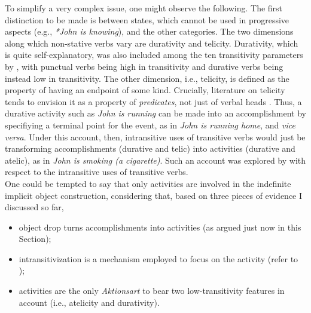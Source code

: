 To simplify a very complex issue, one might observe the following. The first distinction to be made is between states, which cannot be used in progressive aspects (e.g., \textit{*John is knowing}), and the other categories. The two dimensions along which non-stative verbs vary are durativity and telicity. Durativity, which is quite self-explanatory, was also included among the ten transitivity parameters by \textcite{HopperThompson1980}, with punctual verbs being high in transitivity and durative verbs being instead low in transitivity. The other dimension, i.e., telicity, is defined as the property of having an endpoint of some kind. Crucially, literature on telicity tends to envision it as a property of \textit{predicates}, not just of verbal heads \parencite[270]{HopperThompson1980}. Thus, a durative activity such as \textit{John is running} can be made into an accomplishment by specifiying a terminal point for the event, as in \textit{John is running home}, and \textit{vice versa}. Under this account, then, intransitive uses of transitive verbs would just be transforming accomplishments (durative and telic) into activities (durative and atelic), as in \textit{John is smoking (a cigarette)}. Such an account was explored by \textcite{Mittwoch1982} with respect to the intransitive uses of transitive verbs.\\ %
One could be tempted to say that only activities are involved in the indefinite implicit object construction, considering that, based on three pieces of evidence I discussed so far,
\begin{itemize}
    \item object drop turns accomplishments into activities (as argued just now in this Section);
    \item intransitivization is a mechanism employed to focus on the activity (refer to );
    \item activities are the only \textit{Aktionsart} to bear two low-transitivity features in  account (i.e., atelicity and durativity).
\end{itemize}
